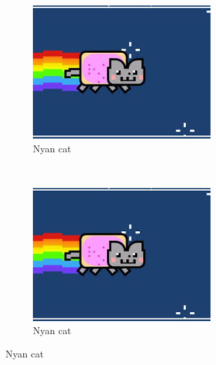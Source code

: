 \documentclass[12pt, %
a4paper, %
twoside, %
openright, %
abstract=on, %
DIV=11,      %
BCOR=8mm]{scrbook} %
\begin{document}
    \begin{figure}
        \centering
        \begin{subfigure}[b]{0.3\textwidth}
            \includegraphics[width=\textwidth]{img/cat.jpeg}
            \caption{Nyan cat}
            \label{fig:cat1}
        \end{subfigure}%
        ~ %
        \begin{subfigure}[b]{0.3\textwidth}
            \includegraphics[width=\textwidth]{img/cat.jpeg}
            \caption{Nyan cat}
            \label{fig:cat2} 
        \end{subfigure}

\end{figure}
\end{document}
